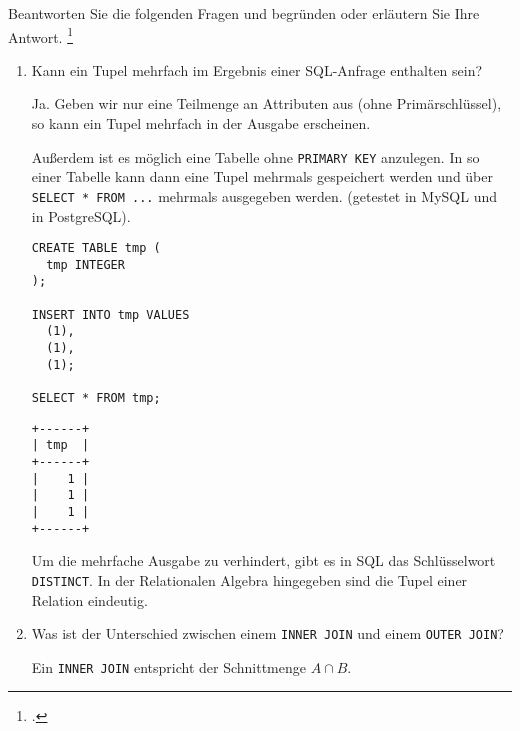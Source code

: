 \documentclass{bschlangaul-aufgabe}
\begin{document}

Beantworten Sie die folgenden Fragen und begründen oder erläutern Sie
Ihre Antwort.
\footcite{examen:66116:2021:03}

\begin{enumerate}


\item Kann ein Tupel mehrfach im Ergebnis einer SQL-Anfrage enthalten
sein?

\begin{liAntwort}
Ja. Geben wir nur eine Teilmenge an Attributen aus (\zB ohne
Primärschlüssel), so kann ein Tupel mehrfach in
der Ausgabe erscheinen.

Außerdem ist es möglich eine Tabelle ohne \texttt{PRIMARY KEY}
anzulegen. In so einer Tabelle kann dann eine Tupel mehrmals gespeichert
werden und über \texttt{SELECT * FROM ...} mehrmals ausgegeben werden.
(getestet in MySQL und in PostgreSQL).

\begin{verbatim}
CREATE TABLE tmp (
  tmp INTEGER
);

INSERT INTO tmp VALUES
  (1),
  (1),
  (1);

SELECT * FROM tmp;
\end{verbatim}

\begin{verbatim}
+------+
| tmp  |
+------+
|    1 |
|    1 |
|    1 |
+------+
\end{verbatim}

Um die mehrfache Ausgabe zu verhindert, gibt es in SQL das
Schlüsselwort \texttt{DISTINCT}. In der Relationalen Algebra hingegeben
sind die Tupel einer Relation eindeutig.
\end{liAntwort}


\item Was ist der Unterschied zwischen einem \texttt{INNER JOIN} und
einem \texttt{OUTER JOIN}?

\begin{liAntwort}
Ein \texttt{INNER JOIN} entspricht der Schnittmenge $A \cap B$.


\end{liAntwort}
\end{enumerate}
\end{document}
